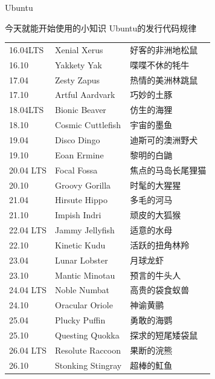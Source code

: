 \documentclass{beamer}
\let\oldfootnotesize\footnotesize
\renewcommand*{\footnotesize}{\oldfootnotesize\tiny}
\begin{document}
\begin{frame}[t]{Ubuntu}
	\begin{block}
		{今天就能开始使用的小知识}
		Ubuntu的发行代码规律

		\footnotesize
		\begin{tabular}{lll}
16.04LTS  & Xenial Xerus      & 好客的非洲地松鼠   \\
16.10     & Yakkety Yak       & 喋喋不休的牦牛     \\
17.04     & Zesty Zapus       & 热情的美洲林跳鼠   \\
17.10     & Artful Aardvark   & 巧妙的土豚         \\
18.04LTS  & Bionic Beaver     & 仿生的海狸         \\
18.10     & Cosmic Cuttlefish & 宇宙的墨鱼         \\
19.04     & Disco Dingo       & 迪斯可的澳洲野犬   \\
19.10     & Eoan Ermine       & 黎明的白鼬         \\
20.04 LTS & Focal Fossa       & 焦点的马岛长尾狸猫 \\
20.10     & Groovy Gorilla    & 时髦的大猩猩       \\
21.04     & Hirsute Hippo     & 多毛的河马         \\
21.10     & Impish Indri      & 顽皮的大狐猴       \\
22.04 LTS & Jammy Jellyfish   & 适意的水母         \\
22.10     & Kinetic Kudu      & 活跃的扭角林羚     \\
23.04     & Lunar Lobster     & 月球龙虾           \\
23.10     & Mantic Minotau    & 预言的牛头人       \\
24.04 LTS & Noble Numbat      & 高贵的袋食蚁兽     \\
24.10     & Oracular Oriole   & 神谕黄鹂           \\
25.04	  & Plucky Puffin	& 勇敢的海鹦	\\
25.10	  & Questing Quokka	& 探求的短尾矮袋鼠	\\
26.04 LTS & Resolute Raccoon& 	果断的浣熊	\\
26.10	& Stonking Stingray	& 超棒的魟鱼	\\
		\end{tabular}
	\end{block}
	
\end{frame}
\end{document}
